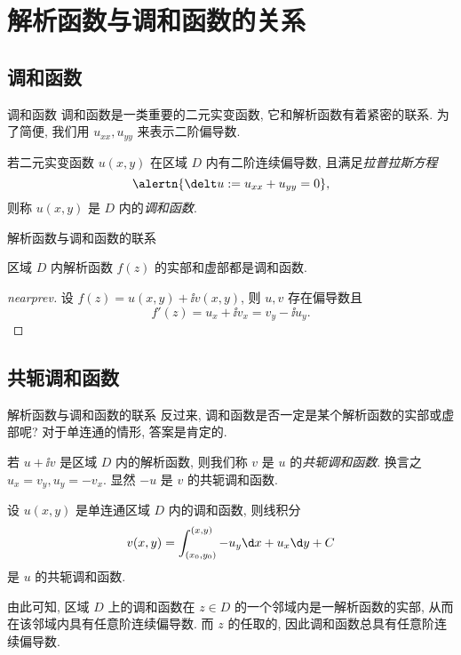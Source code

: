 \section{解析函数与调和函数的关系}


\subsection{调和函数}

\begin{frame}{调和函数}
	\onslide<+->
	调和函数是一类重要的二元实变函数, 它和解析函数有着紧密的联系.
	\onslide<+->
	为了简便, 我们用 $u_{xx},u_{yy}$ 来表示二阶偏导数.
	\onslide<+->
	\begin{definition}
		若二元实变函数 $u(x,y)$ 在区域 $D$ 内有二阶连续偏导数, 且满足\emph{拉普拉斯方程}
		\[
			\alertn{\delt u:=u_{xx}+u_{yy}=0},
		\]
		则称 $u(x,y)$ 是 $D$ 内的\emph{调和函数}.
	\end{definition}
\end{frame}


\begin{frame}{解析函数与调和函数的联系}
	\onslide<+->
	\begin{theorem}[nearnext]
		区域 $D$ 内解析函数 $f(z)$ 的实部和虚部都是调和函数.
	\end{theorem}
	\onslide<+->
	\begin{proof}[nearprev]
		设 $f(z)=u(x,y)+\ii v(x,y)$, 则 $u,v$ 存在偏导数且
		\[
			f'(z)=u_x+\ii v_x=v_y-\ii u_y.
		\]
		\onslide<+->{%
			\[
				\delt v=v_{xx}+v_{yy}=-u_{yx}+u_{xy}=0.\qedhere
			\]
		}\bigdel
	\end{proof}
\end{frame}


\subsection{共轭调和函数}
\begin{frame}{解析函数与调和函数的联系}
	\onslide<+->
	反过来, 调和函数是否一定是某个解析函数的实部或虚部呢?
	\onslide<+->
	对于单连通的情形, 答案是肯定的.

	\onslide<+->
	若 $u+\ii v$ 是区域 $D$ 内的解析函数, 则我们称 $v$ 是 $u$ 的\emph{共轭调和函数}.
	\onslide<+->
	换言之 $u_x=v_y,u_y=-v_x$.
	\onslide<+->
	显然 $-u$ 是 $v$ 的共轭调和函数.
	\onslide<+->
	\begin{theorem}
		设 $u(x,y)$ 是单连通区域 $D$ 内的调和函数, 则线积分
	\[
		v(x,y)=\int_{(x_0,y_0)}^{(x,y)}-u_y\d x+u_x\d y+C
	\]
		是 $u$ 的共轭调和函数.
	\end{theorem}
	\onslide<+->
	由此可知, 区域 $D$ 上的调和函数在 $z\in D$ 的一个邻域内是一解析函数的实部, 从而在该邻域内具有任意阶连续偏导数.
	\onslide<+->
	而 $z$ 的任取的, 因此\alert{调和函数总具有任意阶连续偏导数}.
\end{frame}


